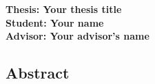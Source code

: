 \documentclass[12pt, twoside, hidelinks]{report} %
\begin{document}
\doublespacing
 
\textbf{Thesis: Your thesis title\\ %
Student: Your name\\
Advisor: Your advisor's name}


\begin{centering}
   \section*{Abstract}
\end{centering}
\markright{}


 
\end{document}
